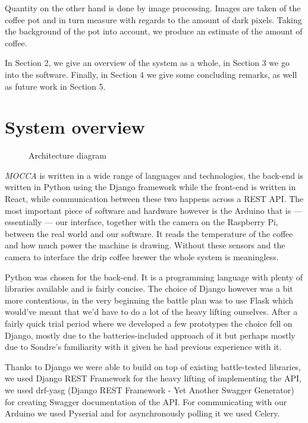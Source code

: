 \documentclass[12pt,a4paper,oneside,article]{memoir}
\numberwithin{equation}{chapter}
\begin{document}
Quantity on the other hand is done by image processing. Images are taken of the
coffee pot and in turn measure with regards to the amount of dark pixels.
Taking the background of the pot into account, we produce an estimate of
the amount of coffee.

In Section 2, we give an overview of the system as a whole, in Section 3 we go 
into the software. Finally, in Section 4 we give some concluding remarks, as 
well as future work in Section 5.


\section{System overview}\label{sec:technical-details}
\begin{figure}[h]
  \centerfloat
  \scalebox{.75}{}
  \caption{Architecture diagram}\label{fig:architecture}
\end{figure}
\textit{MOCCA} is written in a wide range of languages and technologies, the
back-end is written in Python using the Django framework while the front-end is
written in React, while communication between these two happens across a REST
API.
The most important piece of software and hardware however is the Arduino
that is --- essentially --- our interface, together with the camera on the 
Raspberry Pi, between the real world and our software. It reads the temperature 
of the coffee and how much power the machine is drawing. Without these sensors 
and the camera to interface the drip coffee brewer the whole system is 
meaningless. 

Python was chosen for the back-end. It is a programming language with plenty of 
libraries available and is fairly concise. The choice of Django however was a 
bit more contentious, in the very beginning the battle plan was to use Flask 
which would've meant that we'd have to do a lot of the heavy lifting ourselves.
After a fairly quick trial period where we developed a few prototypes the choice
fell on Django, mostly due to the batteries-included approach of it but perhaps
mostly due to Sondre's familiarity with it given he had previous experience with
it.

Thanks to Django we were able to build on top of existing battle-tested
libraries, we used Django REST Framework for the heavy lifting of implementing
the API, we used drf-yasg (Django REST Framework - Yet Another Swagger
Generator) for creating Swagger documentation of the API. For communicating with
our Arduino we used Pyserial and for asynchronously polling it we used Celery.
\end{document}
